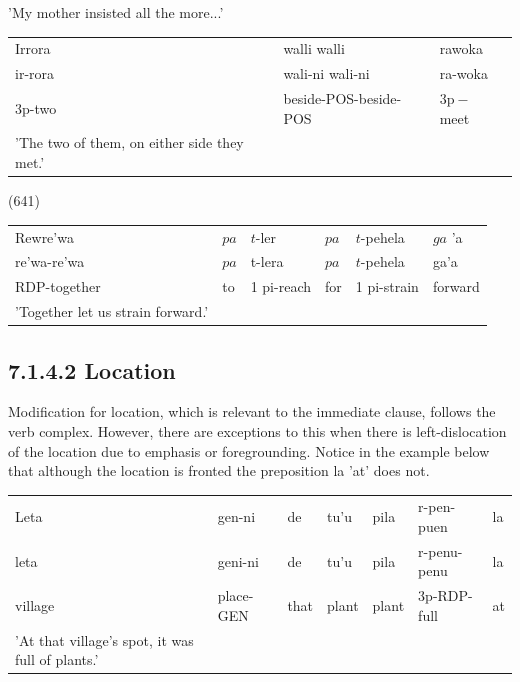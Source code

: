 \documentclass[10pt]{article}
\begin{document}
'My mother insisted all the more...'

\begin{center}
\begin{tabular}{lll}
Irrora & walli walli & rawoka \\
ir-rora & wali-ni wali-ni & ra-woka \\
3p-two & beside-POS-beside-POS & \(3 \mathrm{p}-\) meet \\
'The two of them, on either side they met.' &  &  \\
\end{tabular}
\end{center}

(641)

\begin{center}
\begin{tabular}{llllll}
Rewre'wa & \(p a\) & \(t\)-ler & \(p a\) & \(t\)-pehela & \(g a\) 'a \\
re'wa-re'wa & \(p a\) & t-lera & \(p a\) & \(t\)-pehela & ga'a \\
RDP-together & to & 1 pi-reach & for & 1 pi-strain & forward \\
'Together let us strain forward.' &  &  &  &  &  \\
\end{tabular}
\end{center}

\subsection*{7.1.4.2 Location}
Modification for location, which is relevant to the immediate clause, follows the verb complex. However, there are exceptions to this when there is left-dislocation of the location due to emphasis or foregrounding. Notice in the example below that although the location is fronted the preposition la 'at' does not.

\begin{center}
\begin{tabular}{lllllll}
Leta & gen-ni & de & tu'u & pila & r-pen-puen & la \\
leta & geni-ni & de & tu'u & pila & r-penu-penu & la \\
village & place-GEN & that & plant & plant & 3p-RDP-full & at \\
'At that village's spot, it was full of plants.' &  &  &  &  &  &  \\
\end{tabular}
\end{center}
\end{document}
